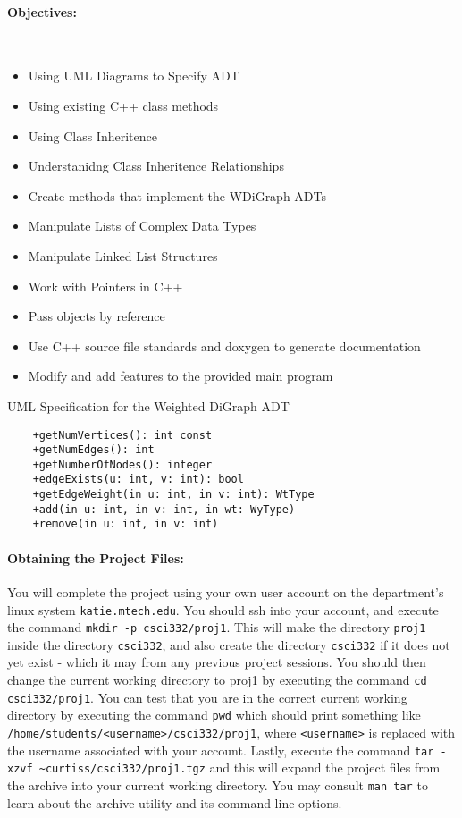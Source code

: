 \documentclass[10pt,letterpaper]{article}
\newcounter{x}\setcounter{x}{1}
\begin{document}
\paragraph{Objectives:} ~
\begin{itemize}
	\item Using UML Diagrams to Specify ADT
	\item Using existing C++ class methods
	\item Using Class Inheritence 
	\item Understanidng Class Inheritence Relationships
	\item Create methods that implement the WDiGraph ADTs
	\item Manipulate Lists of Complex Data Types
	\item Manipulate Linked List Structures
	\item Work with Pointers in C++
	\item Pass objects by reference
	\item Use C++ source file standards and doxygen to generate documentation
	\item Modify and add features to the provided main program
\end{itemize}

\begin{table}
\caption{UML Specification for the Weighted DiGraph ADT} \label{uml:adtWDiGraph}
\begin{lstlisting}
	+getNumVertices(): int const
	+getNumEdges(): int
	+getNumberOfNodes(): integer
	+edgeExists(u: int, v: int): bool
	+getEdgeWeight(in u: int, in v: int): WtType
	+add(in u: int, in v: int, in wt: WyType)
	+remove(in u: int, in v: int)
\end{lstlisting}
\end{table}

\paragraph{Obtaining the Project Files:} You will complete the project using your own user account on the department's linux system \verb|katie.mtech.edu|. You should ssh into your account, and execute the command \verb|mkdir -p csci332/proj1|. This will make the directory \verb|proj1| inside the directory \verb|csci332|, and also create the directory \verb|csci332| if it does not yet exist - which it may from any previous project sessions. You should then change the current working directory to proj1 by executing the command \verb|cd csci332/proj1|. You can test that you are in the correct current working directory by executing the command \verb|pwd| which should print something like \verb|/home/students/<username>/csci332/proj1|, where \verb|<username>| is replaced with the username associated with your account. Lastly, execute the command \verb|tar -xzvf ~curtiss/csci332/proj1.tgz| and this will expand the project files from the archive into your current working directory. You may consult \verb|man tar| to learn about the archive utility and its command line options. 
\end{document}
